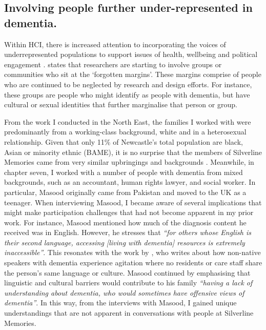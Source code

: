 \subsection{Involving people further under-represented in dementia.}
\label{Under-represented--dementia}
Within HCI, there is increased attention to incorporating the voices of underrepresented populations to support issues of health, wellbeing and political engagement \citep{erete_intersectional_2018}. \cite{harrington_forgotten_2020} states that researchers are starting to involve groups or communities who sit at the `forgotten margins'. These margins comprise of people who are continued to be neglected by research and design efforts. For instance, these groups are people who might identify as people with dementia, but have cultural or sexual identities that further marginalise that person or group. 

From the work I conducted in the North East, the families I worked with were predominantly from a working-class background, white and in a heterosexual relationship. Given that only 11\% of Newcastle's total population are black, Asian or minority ethnic (BAME), it is no surprise that the members of Silverline Memories came from very similar upbringings and backgrounds \citep{cityCouncil_2021}. Meanwhile, in chapter seven, I worked with a number of people with dementia from mixed backgrounds, such as an accountant, human rights lawyer, and social worker. In particular, Masood originally came from Pakistan and moved to the UK as a teenager. When interviewing Masood, I became aware of several implications that might make participation challenges that had not become apparent in my prior work. For instance, Masood mentioned how much of the diagnosis content he received was in English. However, he stresses that \textit{``for others whose English is their second language, accessing [living with dementia] resources is extremely inaccessible''}. This resonates with the work by \cite{cooper2018relationship}, who writes about how non-native speakers with dementia experience agitation where no residents or care staff share the person's same language or culture. Masood continued by emphasising that linguistic and cultural barriers would contribute to his family \textit{``having a lack of understanding about dementia, who would sometimes have offensive views of dementia''}. In this way, from the interviews with Masood, I gained unique understandings that are not apparent in conversations with people at Silverline Memories. 

